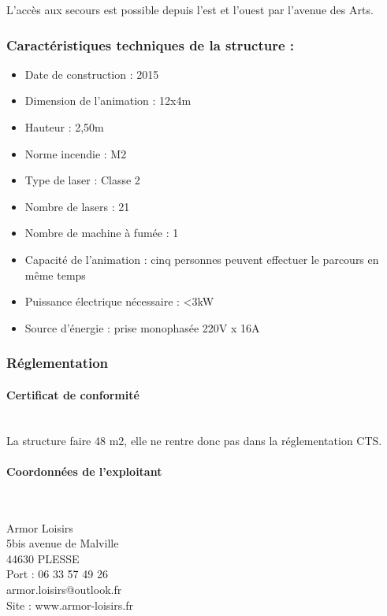 \documentclass[hidelinks, paper=a4, fontsize=13pt]{report}
\begin{document}
L’accès aux secours est possible depuis l'est et l'ouest par l’avenue des Arts. 


\subsubsection{Caractéristiques techniques de la structure :}
\begin{itemize}
\item Date de construction : 2015
\item Dimension de l’animation : 12x4m
\item Hauteur : 2,50m
\item Norme incendie : M2
\item Type de laser : Classe 2 
\item Nombre de lasers : 21
\item Nombre de machine à fumée : 1
\item Capacité de l’animation : cinq personnes peuvent effectuer le parcours en même temps
\item Puissance électrique nécessaire : <3kW
\item Source d’énergie : prise monophasée 220V x 16A
\end{itemize}

\subsubsection{Réglementation}
\paragraph{Certificat de conformité}\mbox{}\\

La structure faire 48 m2, elle ne rentre donc pas dans la réglementation CTS.

\paragraph{Coordonnées de l'exploitant}\mbox{}\\
\begin{center}
Armor Loisirs \\
5bis avenue de Malville \\
44630 PLESSE  \\
Port : 06 33 57 49 26  \\
armor.loisirs@outlook.fr \\
Site : www.armor-loisirs.fr \\
\end{center}
\end{document}
